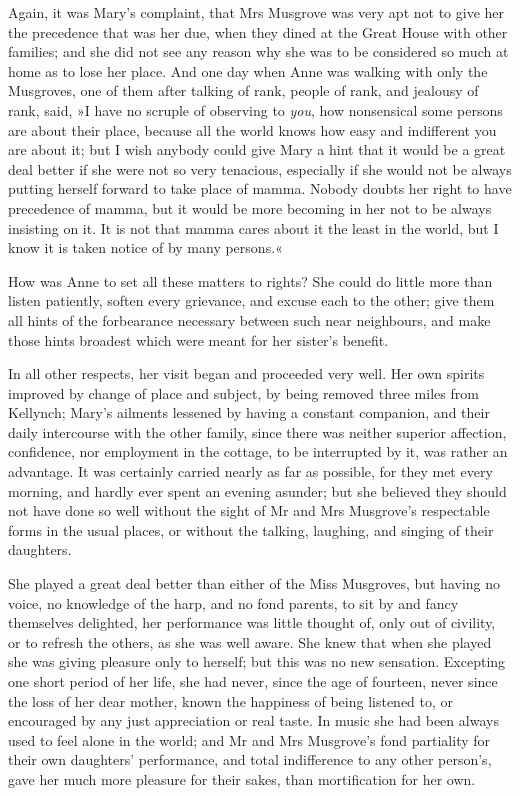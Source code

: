 Again, it was Mary's complaint, that Mrs Musgrove was very apt not to give her the precedence that was her due, when they dined at the Great House with other families; and she did not see any reason why she was to be considered so much at home as to lose her place. And one day when Anne was walking with only the Musgroves, one of them after talking of rank, people of rank, and jealousy of rank, said, »I have no scruple of observing to \textit{you}, how nonsensical some persons are about their place, because all the world knows how easy and indifferent you are about it; but I wish anybody could give Mary a hint that it would be a great deal better if she were not so very tenacious, especially if she would not be always putting herself forward to take place of mamma. Nobody doubts her right to have precedence of mamma, but it would be more becoming in her not to be always insisting on it. It is not that mamma cares about it the least in the world, but I know it is taken notice of by many persons.«

How was Anne to set all these matters to rights? She could do little more than listen patiently, soften every grievance, and excuse each to the other; give them all hints of the forbearance necessary between such near neighbours, and make those hints broadest which were meant for her sister's benefit.

In all other respects, her visit began and proceeded very well. Her own spirits improved by change of place and subject, by being removed three miles from Kellynch; Mary's ailments lessened by having a constant companion, and their daily intercourse with the other family, since there was neither superior affection, confidence, nor employment in the cottage, to be interrupted by it, was rather an advantage. It was certainly carried nearly as far as possible, for they met every morning, and hardly ever spent an evening asunder; but she believed they should not have done so well without the sight of Mr and Mrs Musgrove's respectable forms in the usual places, or without the talking, laughing, and singing of their daughters.

She played a great deal better than either of the Miss Musgroves, but having no voice, no knowledge of the harp, and no fond parents, to sit by and fancy themselves delighted, her performance was little thought of, only out of civility, or to refresh the others, as she was well aware. She knew that when she played she was giving pleasure only to herself; but this was no new sensation. Excepting one short period of her life, she had never, since the age of fourteen, never since the loss of her dear mother, known the happiness of being listened to, or encouraged by any just appreciation or real taste. In music she had been always used to feel alone in the world; and Mr and Mrs Musgrove's fond partiality for their own daughters' performance, and total indifference to any other person's, gave her much more pleasure for their sakes, than mortification for her own.

